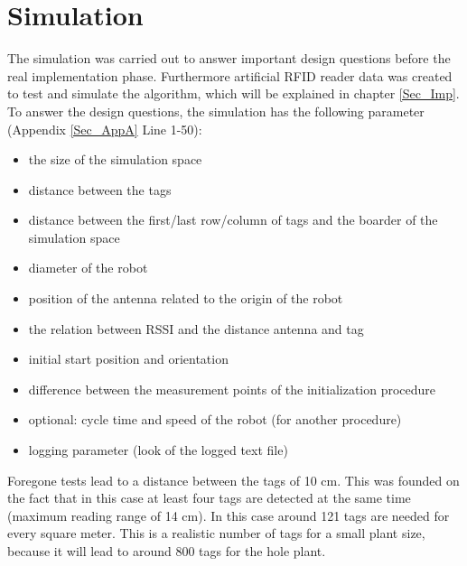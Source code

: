 \section{Simulation} \label{Sec_Sim}
The simulation was carried out to answer important design questions before the real implementation phase. Furthermore artificial RFID reader data was created to test and simulate the algorithm, which will be explained in chapter \ref{Sec_Imp}. \\
To answer the design questions, the simulation has the following parameter (Appendix \ref{Sec_AppA} Line 1-50):\begin{itemize}
	\item the size of the simulation space
	\item distance between the tags
	\item distance between the first/last row/column of tags and the boarder of the simulation space
	\item diameter of the robot
	\item position of the antenna related to the origin of the robot
	\item the relation between RSSI and the distance antenna and tag
	\item initial start position and orientation
	\item difference between the measurement points of the initialization procedure
	\item optional: cycle time and speed of the robot (for another procedure)
	\item logging parameter (look of the logged text file)
\end{itemize}	
Foregone tests lead to a distance between the tags of 10 cm. This was founded on the fact that in this case at least four tags are detected at the same time (maximum reading range of 14 cm). In this case around 121 tags are needed for every square meter. This is a realistic number of tags for a small plant size, because it will lead to around 800 tags for the hole plant. \\

